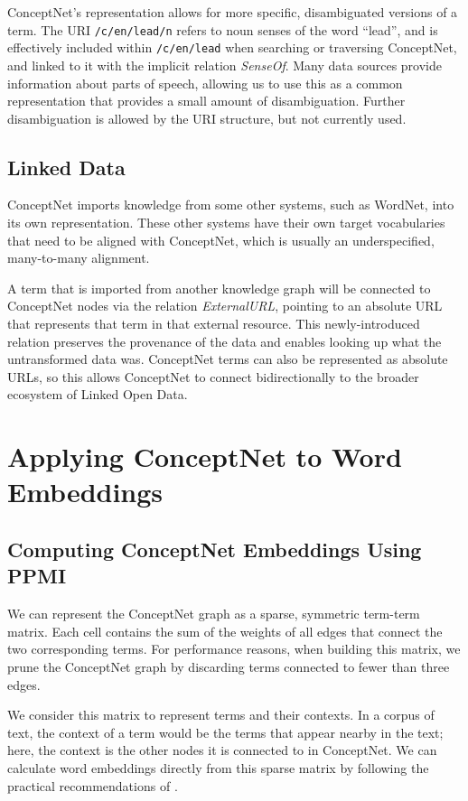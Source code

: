 \documentclass[letterpaper]{article}
\begin{document}
ConceptNet's representation allows for more specific, disambiguated
versions of a term. The URI \texttt{/c/en/lead/n} refers to noun senses
of the word ``lead'', and is effectively included within
\texttt{/c/en/lead} when searching or traversing ConceptNet, and
linked to it with the implicit relation \emph{SenseOf}. Many data
sources provide information about parts of speech, allowing us to use
this as a common representation that provides a small amount of
disambiguation. Further disambiguation is allowed by the URI structure,
but not currently used.

\subsection{Linked Data}

ConceptNet imports knowledge from some other systems, such as WordNet, into its
own representation. These other systems have their own target vocabularies that
need to be aligned with ConceptNet, which is usually an underspecified,
many-to-many alignment.

A term that is imported from another knowledge graph will be connected to
ConceptNet nodes via the relation \emph{ExternalURL}, pointing to an absolute
URL that represents that term in that external resource. This newly-introduced
relation preserves the provenance of the data and enables looking up what the
untransformed data was. ConceptNet terms can also be represented as absolute
URLs, so this allows ConceptNet to connect bidirectionally to the broader
ecosystem of Linked Open Data.

\section{Applying ConceptNet to Word Embeddings}

\subsection{Computing ConceptNet Embeddings Using PPMI}

We can represent the ConceptNet graph as a sparse, symmetric term-term matrix.
Each cell contains the sum of the weights of all edges that connect the two
corresponding terms. For performance reasons, when building this matrix, we
prune the ConceptNet graph by discarding terms connected to fewer than three
edges.

We consider this matrix to represent terms and their contexts. In a corpus of
text, the context of a term would be the terms that appear nearby in the text;
here, the context is the other nodes it is connected to in ConceptNet. We can
calculate word embeddings directly from this sparse matrix by following the
practical recommendations of \citeauthor{levy2015embeddings}
.
\end{document}
